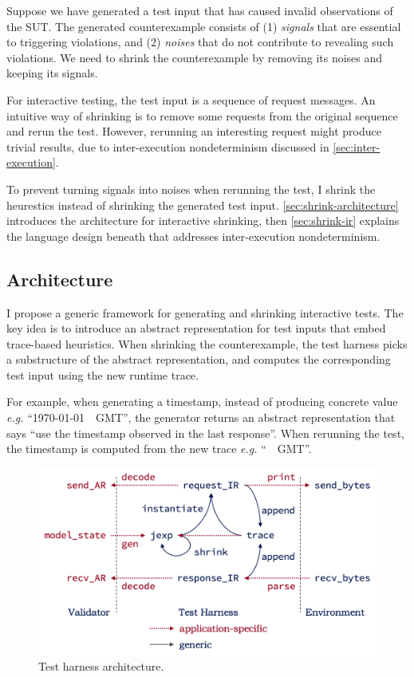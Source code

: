 Suppose we have generated a test input that has caused invalid observations of
the SUT.  The generated counterexample consists of (1) {\em signals} that are
essential to triggering violations, and (2) {\em noises} that do not contribute
to revealing such violations.  We need to shrink the counterexample by removing
its noises and keeping its signals.

For interactive testing, the test input is a sequence of request messages.  An
intuitive way of shrinking is to remove some requests from the original sequence
and rerun the test.  However, rerunning an interesting request might produce
trivial results, due to inter-execution nondeterminism discussed in
\autoref{sec:inter-execution}.

To prevent turning signals into noises when rerunning the test, I shrink the
heurestics instead of shrinking the generated test input.
\autoref{sec:shrink-architecture} introduces the architecture for interactive
shrinking, then \autoref{sec:shrink-ir} explains the language design beneath
that addresses inter-execution nondeterminism.

\subsection{Architecture}
\label{sec:shrink-architecture}

I propose a generic framework for generating and shrinking interactive tests.
The key idea is to introduce an abstract representation for test inputs that
embed trace-based heuristics.  When shrinking the counterexample, the test
harness picks a substructure of the abstract representation, and computes the
corresponding test input using the new runtime trace.

For example, when generating a timestamp, instead of producing concrete value
{\it e.g.} ``\httpdate\today~\currenttime~GMT'', the generator returns an
abstract representation that says ``use the timestamp observed in the last
response''.  When rerunning the test, the timestamp is computed from the new
trace {\it e.g.} ``\httpdate\DayAfter~\currenttime~GMT''.

\begin{figure}
  \includegraphics[width=.8\textwidth]{figures/shrink}
  \caption{Test harness architecture.}
  \label{fig:shrink}
\end{figure}

